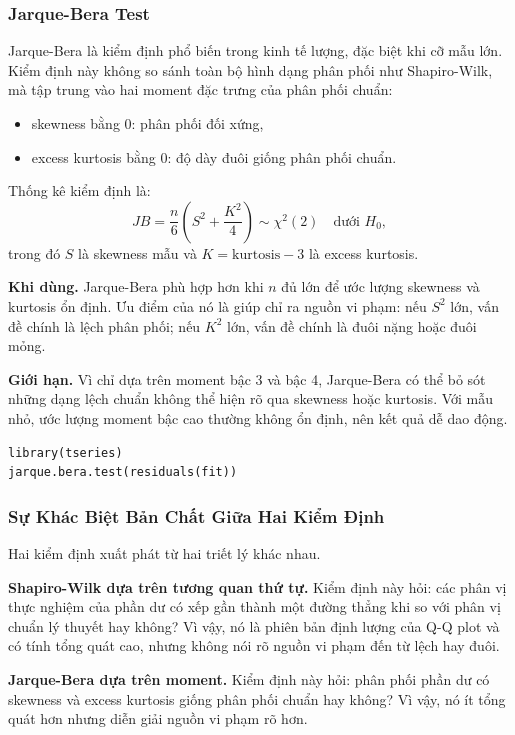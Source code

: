 \subsubsection{Jarque-Bera Test}

Jarque-Bera là kiểm định phổ biến trong kinh tế lượng, đặc biệt khi cỡ mẫu lớn. Kiểm định này không so sánh toàn bộ hình dạng phân phối như Shapiro-Wilk, mà tập trung vào hai moment đặc trưng của phân phối chuẩn:
\begin{itemize}
  \item skewness bằng 0: phân phối đối xứng,
  \item excess kurtosis bằng 0: độ dày đuôi giống phân phối chuẩn.
\end{itemize}

Thống kê kiểm định là:
\[
  JB = \frac{n}{6}\!\left(S^2 + \frac{K^2}{4}\right)
  \sim \chi^2(2) \quad \text{dưới } H_0,
\]
trong đó $S$ là skewness mẫu và $K = \text{kurtosis} - 3$ là excess kurtosis.

\textbf{Khi dùng.} Jarque-Bera phù hợp hơn khi $n$ đủ lớn để ước lượng skewness và kurtosis ổn định. Ưu điểm của nó là giúp chỉ ra nguồn vi phạm: nếu $S^2$ lớn, vấn đề chính là lệch phân phối; nếu $K^2$ lớn, vấn đề chính là đuôi nặng hoặc đuôi mỏng.

\textbf{Giới hạn.} Vì chỉ dựa trên moment bậc 3 và bậc 4, Jarque-Bera có thể bỏ sót những dạng lệch chuẩn không thể hiện rõ qua skewness hoặc kurtosis. Với mẫu nhỏ, ước lượng moment bậc cao thường không ổn định, nên kết quả dễ dao động.

\begin{lstlisting}[style=Rstyle]
library(tseries)
jarque.bera.test(residuals(fit))
\end{lstlisting}

\subsubsection{Sự Khác Biệt Bản Chất Giữa Hai Kiểm Định}

Hai kiểm định xuất phát từ hai triết lý khác nhau.

\textbf{Shapiro-Wilk dựa trên tương quan thứ tự.} Kiểm định này hỏi: các phân vị thực nghiệm của phần dư có xếp gần thành một đường thẳng khi so với phân vị chuẩn lý thuyết hay không? Vì vậy, nó là phiên bản định lượng của Q-Q plot và có tính tổng quát cao, nhưng không nói rõ nguồn vi phạm đến từ lệch hay đuôi.

\textbf{Jarque-Bera dựa trên moment.} Kiểm định này hỏi: phân phối phần dư có skewness và excess kurtosis giống phân phối chuẩn hay không? Vì vậy, nó ít tổng quát hơn nhưng diễn giải nguồn vi phạm rõ hơn.

